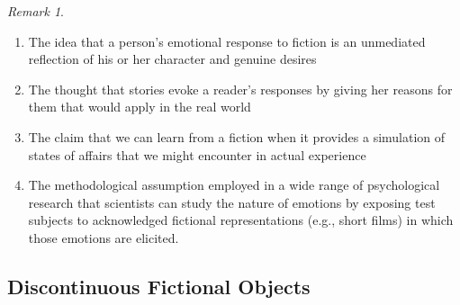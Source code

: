 \documentclass[
  letterpaper,
  DIV=11,
  numbers=noendperiod]{scrartcl}
\providecommand{\tightlist}{%
  \setlength{\itemsep}{0pt}\setlength{\parskip}{0pt}}
\theoremstyle{remark}
\newtheorem*{remark}{Remark}
\begin{document}
\begin{remark}
\leavevmode

\begin{enumerate}
\def\labelenumi{\arabic{enumi}.}
\tightlist
\item
  The idea that a person's emotional response to fiction is an
  unmediated reflection of his or her character and genuine desires
\item
  The thought that stories evoke a reader's responses by giving her
  reasons for them that would apply in the real world
\item
  The claim that we can learn from a fiction when it provides a
  simulation of states of affairs that we might encounter in actual
  experience
\item
  The methodological assumption employed in a wide range of
  psychological research that scientists can study the nature of
  emotions by exposing test subjects to acknowledged fictional
  representations (e.g., short films) in which those emotions are
  elicited.
\end{enumerate}

\end{remark}

\subsection{Discontinuous Fictional
Objects}\label{discontinuous-fictional-objects}
\end{document}
